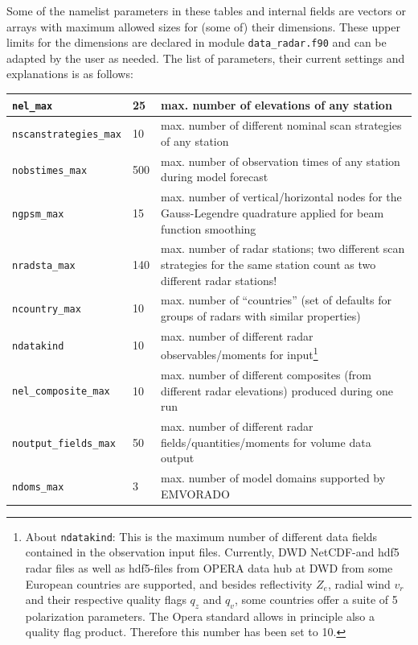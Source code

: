 \documentclass[10pt,a4paper,twoside,headinclude,footinclude,parskip=half]{scrartcl}
\newcommand{\srcform}[1]{\mbox{\texttt{#1}}\xspace}%
\newcommand{\paramform}[1]{\mbox{\texttt{#1}}\xspace}%
\begin{document}
Some of the namelist parameters in these tables and internal fields are vectors or arrays with  maximum allowed sizes for (some of) their dimensions. These upper limits for the dimensions are declared in module \srcform{data_radar.f90}
and can be adapted by the user as needed. The list of parameters, their current settings and explanations is as follows:
\begin{small}
\setlength{\extrarowheight}{0.25\baselineskip}
\begin{longtable}{p{}p{}<{\vspace*{\extrarowheight}}p{}<{\vspace*{\extrarowheight}}}
\hline
\paramform{nel_max}              & 25  & max. number of elevations of any station                               \\\hline
\paramform{nscanstrategies_max}  & 10  & max. number of different nominal scan strategies of any station        \\\hline
\paramform{nobstimes_max}        & 500 & max. number of observation times of any station during model forecast  \\\hline
\paramform{ngpsm_max}            & 15  & max. number of vertical/horizontal nodes for the Gauss-Legendre quadrature
                                         applied for beam function smoothing \\\hline
\paramform{nradsta_max}          & 140 & max. number of radar stations; two different scan strategies for the
                                         same station count as two different radar stations!  \\\hline
\paramform{ncountry_max}         & 10  & max. number of ``countries'' (set of defaults for groups of radars with similar properties)  \\\hline
\paramform{ndatakind}            & 10  & max. number of different radar observables/moments for input\footnote{About \paramform{ndatakind}: This is the maximum number of different data fields contained
in the observation input files. Currently, DWD NetCDF-and hdf5 radar files as well as hdf5-files from OPERA data hub at DWD from some European countries are supported, and besides reflectivity $Z_e$, radial wind $v_r$ and their respective quality flags $q_z$ and $q_v$, some countries offer a suite of 5 polarization parameters. The Opera standard allows in principle also a quality flag product.
Therefore this number has been set to 10.}
\\\hline
\paramform{nel_composite_max}    & 10  & max. number of different composites (from different radar elevations) produced during one run  \\\hline
\paramform{noutput_fields_max}   & 50  & max. number of different radar fields/quantities/moments for volume data output \\\hline
\paramform{ndoms_max}            &  3  & max. number of model domains supported by EMVORADO  \\\hline
\end{longtable}
\end{small}
\end{document}
